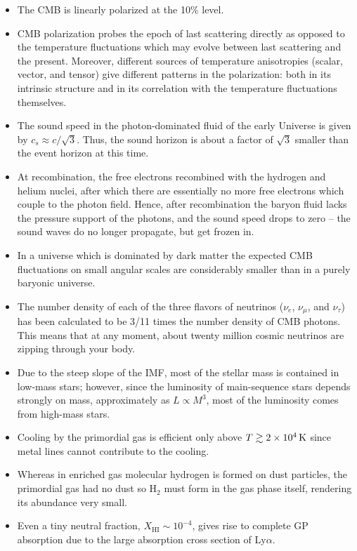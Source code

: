 \documentclass[a4paper,10pt]{article}
\begin{document}
\begin{itemize}
    \item The CMB is linearly polarized at the 10\% level.
    \item CMB polarization probes the epoch of last scattering directly as opposed to the temperature fluctuations which may evolve between last scattering and the present. Moreover, different sources of temperature anisotropies (scalar, vector, and tensor) give different patterns in the polarization: both in its intrinsic structure and in its correlation with the temperature fluctuations themselves.
    \item The sound speed in the photon-dominated fluid of the early Universe is given by $c_s\approx c/\sqrt{3}$. Thus, the sound horizon is about a factor of $\sqrt{3}$ smaller than the event horizon at this time.
    \item At recombination, the free electrons recombined with the hydrogen and helium nuclei, after which there are essentially no more free electrons which couple to the photon field. Hence, after recombination the baryon fluid lacks the pressure support of the photons, and the sound speed drops to zero -- the sound waves do no longer propagate, but get frozen in.
    \item In a universe which is dominated by dark matter the expected CMB fluctuations on small angular scales are considerably smaller than in a purely baryonic universe.
    \item The number density of each of the three flavors of neutrinos ($\nu_e$, $\nu_\mu$, and $\nu_\tau$) has been calculated to be 3/11 times the number density of CMB photons. This means that at any moment, about twenty million cosmic neutrinos are zipping through your body.
    \item Due to the steep slope of the IMF, most of the stellar mass is contained in low-mass stars; however, since the luminosity of main-sequence stars depends strongly on mass, approximately as $L\propto M^3$, most of the luminosity comes from high-mass stars.
    \item Cooling by the primordial gas is efficient only above $T\gtrsim2\times10^4\,{\rm K}$ since metal lines cannot contribute to the cooling.
    \item Whereas in enriched gas molecular hydrogen is formed on dust particles, the primordial gas had no dust so H$_2$ must form in the gas phase itself, rendering its abundance very small.
    \item Even a tiny neutral fraction, $X_\mathrm{HI}\sim10^{-4}$, gives rise to complete GP absorption due to the large absorption cross section of Ly$\alpha$.

\end{itemize}
\end{document}
